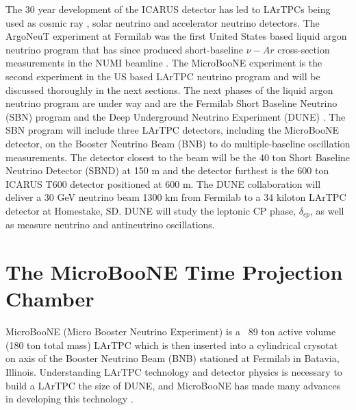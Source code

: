 The 30 year development of the ICARUS detector has led to LArTPCs being used as cosmic ray \cite{lartpc_cosmic}, solar neutrino \cite{lartpc_solar} and accelerator neutrino \cite{lartpc_accelerator} detectors. The ArgoNeuT experiment at Fermilab was the first United States based liquid argon neutrino program that has since produced short-baseline $\nu-Ar$ cross-section measurements in the NUMI beamline \cite{argoneut}. The MicroBooNE experiment is the second experiment in the US based LArTPC neutrino program and will be discussed thoroughly in the next sections.  
The next phases of the liquid argon neutrino program are under way and are the Fermilab Short Baseline Neutrino (SBN) program \cite{sbn} and the Deep Underground Neutrino Experiment (DUNE) \cite{dune}. The SBN program will include three LArTPC detectors, including the MicroBooNE detector, on the Booster Neutrino Beam (BNB) to do multiple-baseline oscillation measurements. The detector closest to the beam will be the 40 ton Short Baseline Neutrino Detector (SBND)\cite{sbnd} at 150 m and the detector furthest is the 600 ton ICARUS T600 \cite{icarus_t600} detector positioned at 600 m. The DUNE collaboration will deliver a 30 GeV neutrino beam 1300 km from Fermilab to a 34 kiloton LArTPC detector at Homestake, SD. DUNE will study the leptonic CP phase, $\delta_{cp}$, as well as measure neutrino and antineutrino oscillations. 
\section{The MicroBooNE Time Projection Chamber}
MicroBooNE (Micro Booster Neutrino Experiment) is a ~89 ton active volume (180 ton total mass) LArTPC which is then inserted into a cylindrical crysotat on axis of the Booster Neutrino Beam (BNB) stationed at Fermilab in Batavia, Illinois. Understanding LArTPC technology and detector physics is necessary to build a LArTPC the size of DUNE, and MicroBooNE has made many advances in developing this technology\cite{noisechar} \cite{michel}. 


